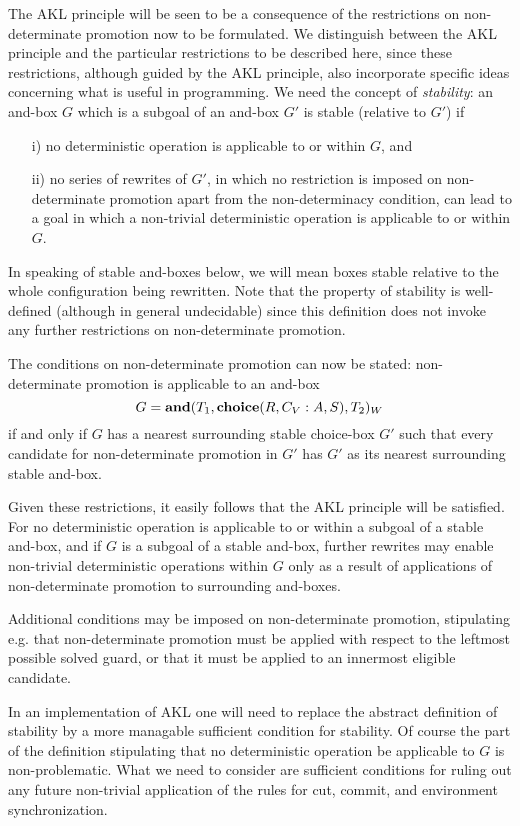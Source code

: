 The AKL principle will be seen to be a consequence of the restrictions
on non-determinate promotion now to be formulated. We distinguish
between the AKL principle and the particular restrictions to be
described here, since these restrictions, although guided by the AKL
principle, also incorporate specific ideas concerning what is useful
in programming. We need the concept of {\em stability}: an and-box $G$
which is a subgoal of an and-box $G'$ is stable (relative to $G'$) if
\begin{itemize}
\item[i)] no deterministic operation is applicable to or within $G$, and
\item[ii)] no series of rewrites of $G'$, in which no restriction is imposed
on non-deter\-min\-ate promotion apart from the non-determinacy
condition, can lead to a goal in which a non-trivial deterministic
operation is applicable to or within $G$.
\end{itemize}
In speaking of stable and-boxes below, we will mean boxes stable
relative to the whole configuration being rewritten.  Note that the
property of stability is well-defined (although in general
undecidable) since this definition does not invoke any further
restrictions on non-determinate promotion.

The conditions on non-determinate promotion can now be stated:
non-deter\-min\-ate promotion is applicable to an and-box $$G =
\mbox{\bf and}(T_1, \mbox{\bf choice}(R, C_V \mathrel{\mbox{:}} A, S), T_2)_W$$ if and only if $G$
has a nearest surrounding stable choice-box $G'$ such that every
candidate for non-determinate promotion in $G'$ has $G'$ as its
nearest surrounding stable and-box.

Given these restrictions, it easily follows that the AKL principle
will be satisfied. For no deterministic operation is applicable to or
within a subgoal of a stable and-box, and if $G$ is a subgoal of a stable
and-box, further rewrites may enable non-trivial deterministic operations
within $G$ only as a result of applications of non-determinate promotion
to surrounding and-boxes.

Additional conditions may be imposed on non-determinate promotion,
stipulating e.g. that non-determinate promotion must be applied
with respect to the leftmost possible solved guard, or that it must
be applied to an innermost eligible candidate.

In an implementation of AKL one will need to replace the abstract
definition of stability by a more managable sufficient condition for
stability. Of course the part of the definition stipulating that no
deterministic operation be applicable to $G$ is non-problematic.  What
we need to consider are sufficient conditions for ruling out any
future non-trivial application of the rules for cut, commit, and
environment synchronization.

